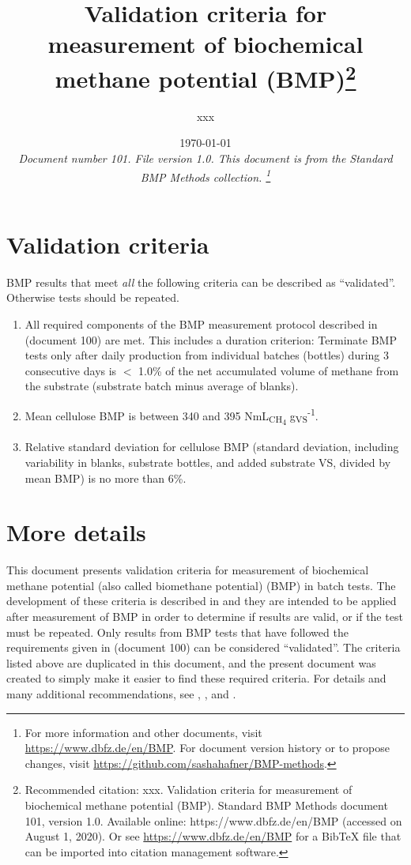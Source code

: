 \documentclass[]{article}
\title {Validation criteria for measurement of biochemical methane potential (BMP)\footnote{
  Recommended citation: 
xxx. Validation criteria for measurement of biochemical methane potential (BMP). Standard BMP Methods document 101, version 1.0. Available online: https://www.dbfz.de/en/BMP (accessed on August 1, 2020).
\newline
  Or see \url{https://www.dbfz.de/en/BMP} for a BibTeX file that can be imported into citation management software.
}}
\author{
  xxx
}
\date{\today \\
\bigskip
\textit{
  Document number 101.
  File version 1.0. 
  This document is from the Standard BMP Methods collection.
    \footnote{For more information and other documents, visit \url{https://www.dbfz.de/en/BMP}. 
    For document version history or to propose changes, visit \url{https://github.com/sashahafner/BMP-methods}.}
}
}
\begin{document}
\maketitle

\section{Validation criteria}
\label{sec:crit}
BMP results that meet \textit{all} the following criteria can be described as ``validated''.
Otherwise tests should be repeated.

\begin{enumerate}
  \item All required components of the BMP measurement protocol described in \citet{BMPdoc100req} (document 100) are met. 
    This includes a duration criterion: Terminate BMP tests only after daily  production from individual batches (bottles) during 3 consecutive days is $<$ 1.0\% of the net accumulated volume of methane from the substrate (substrate batch minus average of blanks). 
  \item Mean cellulose BMP is between 340 and 395 NmL\textsubscript{CH\textsubscript{4}} g\textsubscript{VS}\textsuperscript{-1}.
  \item Relative standard deviation for cellulose BMP (standard deviation, including variability in blanks, substrate bottles, and added substrate VS, divided by mean BMP) is no more than 6\%.
\end{enumerate}


\section{More details}
This document presents validation criteria for measurement of biochemical methane potential (also called biomethane potential) (BMP) in batch tests.
The development of these criteria is described in \citet{hafnerImprovingInterlaboratoryReproducibility2020} and they are intended to be applied after measurement of BMP in order to determine if results are valid, or if the test must be repeated.
Only results from BMP tests that have followed the requirements given in \citet{BMPdoc100req} (document 100) can be considered ``validated''.
The criteria listed above are duplicated in this document, and the present document was created to simply make it easier to find these required criteria.
For details and many additional recommendations, see \citet{holligerStandardizationBiomethanePotential2016}, \citet{hafnerImprovingInterlaboratoryReproducibility2020}, and \citet{BMPdoc100req}.


\end{document}
